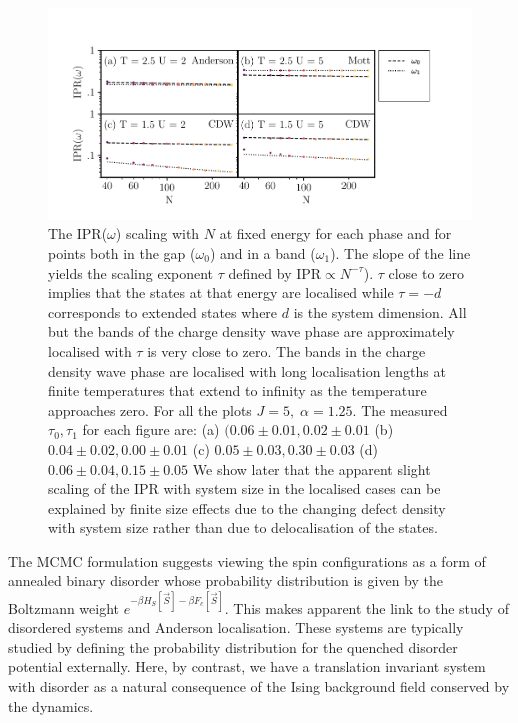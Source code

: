 \hypertarget{fig:IPR_scaling}{%
\begin{figure}
\centering
\includegraphics[width=1\textwidth,height=\textheight]{figure_code/fk_chapter/DOS/IPR_scaling}
\caption[{Scaling of IPR(\(\omega\)) against system size \(N\).}]{The IPR(\(\omega\)) scaling with \(N\) at fixed energy for each phase and for points both in the gap (\(\omega_0\)) and in a band (\(\omega_1\)). The slope of the line yields the scaling exponent \(\tau\) defined by \(\mathrm{IPR} \propto N^{-\tau}\)). \(\tau\) close to zero implies that the states at that energy are localised while \(\tau = -d\) corresponds to extended states where \(d\) is the system dimension. All but the bands of the charge density wave phase are approximately localised with \(\tau\) is very close to zero. The bands in the charge density wave phase are localised with long localisation lengths at finite temperatures that extend to infinity as the temperature approaches zero. For all the plots \(J = 5,\;\alpha = 1.25\). The measured \(\tau_0,\tau_1\) for each figure are: (a) \((0.06\pm0.01, 0.02\pm0.01\) (b) \(0.04\pm0.02, 0.00\pm0.01\) (c) \(0.05\pm0.03, 0.30\pm0.03\) (d) \(0.06\pm0.04, 0.15\pm0.05\) We show later that the apparent slight scaling of the IPR with system size in the localised cases can be explained by finite size effects due to the changing defect density with system size rather than due to delocalisation of the states.}
\label{fig:IPR_scaling}
\end{figure}
}

The MCMC formulation suggests viewing the spin configurations as a form of annealed binary disorder whose probability distribution is given by the Boltzmann weight \(e^{-\beta H_S[\vec{S}] - \beta F_c[\vec{S}]}\). This makes apparent the link to the study of disordered systems and Anderson localisation. These systems are typically studied by defining the probability distribution for the quenched disorder potential externally. Here, by contrast, we have a translation invariant system with disorder as a natural consequence of the Ising background field conserved by the dynamics.

